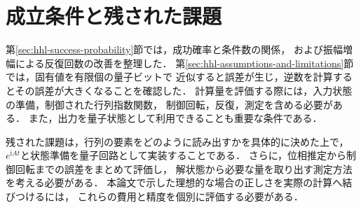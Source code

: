 \section{成立条件と残された課題}
\label{sec:conditions-future-work}

第\ref{sec:hhl-success-probability}節では，成功確率と条件数の関係，
および振幅増幅による反復回数の改善を整理した．
第\ref{sec:hhl-assumptions-and-limitations}節では，固有値を有限個の量子ビットで
近似すると誤差が生じ，逆数を計算するとその誤差が大きくなることを確認した．
計算量を評価する際には，入力状態の準備，制御された行列指数関数，
制御回転，反復，測定を含める必要がある．
また，出力を量子状態として利用できることも重要な条件である．

残された課題は，行列の要素をどのように読み出すかを具体的に決めた上で，
$e^{\mathrm{i}At}$と状態準備を量子回路として実装することである．
さらに，位相推定から制御回転までの誤差をまとめて評価し，
解状態から必要な量を取り出す測定方法を考える必要がある．
本論文で示した理想的な場合の正しさを実際の計算へ結びつけるには，
これらの費用と精度を個別に評価する必要がある．

